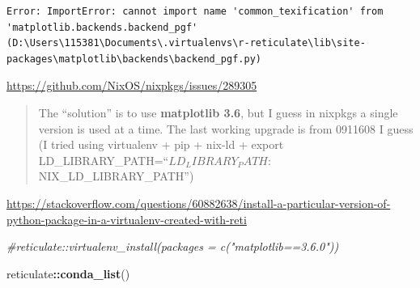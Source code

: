 \documentclass[
]{book}
\newenvironment{Shaded}{\begin{snugshade}}{\end{snugshade}}
\newcommand{\CommentTok}[1]{\textcolor[rgb]{0.56,0.35,0.01}{\textit{#1}}}
\newcommand{\FunctionTok}[1]{\textcolor[rgb]{0.13,0.29,0.53}{\textbf{#1}}}
\newcommand{\NormalTok}[1]{#1}
\newcommand{\SpecialCharTok}[1]{\textcolor[rgb]{0.81,0.36,0.00}{\textbf{#1}}}
\theoremstyle{definition}
\theoremstyle{definition}
\theoremstyle{definition}
\theoremstyle{definition}
\theoremstyle{remark}
\begin{document}
\begin{verbatim}
Error: ImportError: cannot import name 'common_texification' from 'matplotlib.backends.backend_pgf' (D:\Users\115381\Documents\.virtualenvs\r-reticulate\lib\site-packages\matplotlib\backends\backend_pgf.py)
\end{verbatim}

\url{https://github.com/NixOS/nixpkgs/issues/289305}

\begin{quote}
The ``solution'' is to use \textbf{matplotlib 3.6}, but I guess in nixpkgs a single version is used at a time. The last working upgrade is from 0911608 I guess (I tried using virtualenv + pip + nix-ld + export LD\_LIBRARY\_PATH=``\(LD_LIBRARY_PATH:\)NIX\_LD\_LIBRARY\_PATH'')
\end{quote}

\url{https://stackoverflow.com/questions/60882638/install-a-particular-version-of-python-package-in-a-virtualenv-created-with-reti}

\begin{Shaded}
\begin{Highlighting}[]
\CommentTok{\#reticulate::virtualenv\_install(packages = c("matplotlib==3.6.0"))}
\end{Highlighting}
\end{Shaded}

\begin{Shaded}
\begin{Highlighting}[]
\NormalTok{reticulate}\SpecialCharTok{::}\FunctionTok{conda\_list}\NormalTok{()}
\end{Highlighting}
\end{Shaded}
\end{document}
